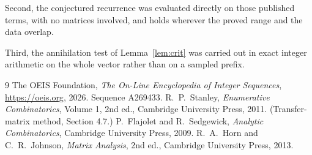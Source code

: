 \documentclass[11pt,a4paper]{article}
\theoremstyle{plain}
\theoremstyle{definition}
\begin{document}
Second, the conjectured recurrence was evaluated directly on those published terms, with no
matrices involved, and holds wherever the proved range and the data overlap.

Third, the annihilation test of Lemma~\ref{lem:crit} was carried out in exact integer
arithmetic on the whole vector rather than on a sampled prefix.

\begin{thebibliography}{9}
 The OEIS Foundation, \emph{The On-Line Encyclopedia of Integer
Sequences}, \url{https://oeis.org}, 2026. Sequence A269433.
 R.~P.~Stanley, \emph{Enumerative Combinatorics}, Volume 1, 2nd ed.,
Cambridge University Press, 2011. (Transfer-matrix method, Section 4.7.)
 P.~Flajolet and R.~Sedgewick, \emph{Analytic Combinatorics}, Cambridge
University Press, 2009.
 R.~A.~Horn and C.~R.~Johnson, \emph{Matrix Analysis}, 2nd ed., Cambridge
University Press, 2013.
\end{thebibliography}
\end{document}

